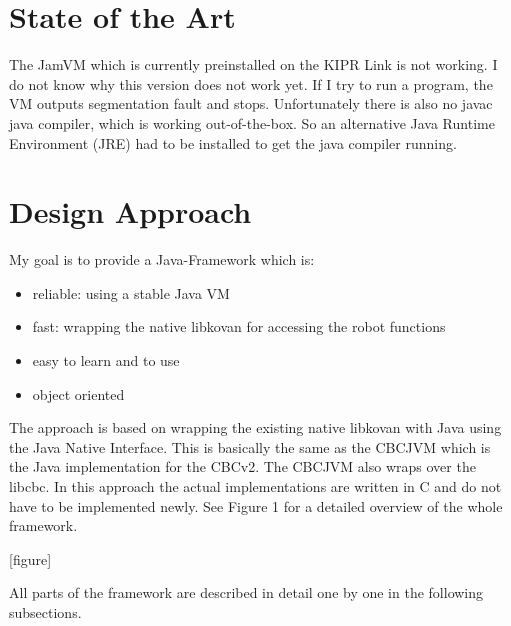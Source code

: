 \documentclass{juniorjournal}
\begin{document}
\section{State of the Art}
The JamVM which is currently preinstalled on the KIPR Link is not working.
I do not know why this version does not work yet.
If I try to run a program, the VM outputs \frqq segmentation fault \flqq and stops.
Unfortunately there is also no javac java compiler, which is working out-of-the-box.
So an alternative Java Runtime Environment (JRE) had to be installed to get the java compiler running.

\section{Design Approach}
My goal is to provide a Java-Framework which is:
\begin{itemize}
	\item reliable: using a stable Java VM
	\item fast: wrapping the native libkovan for accessing the robot functions
	\item easy to learn and to use
	\item object oriented
\end{itemize}
The approach is based on wrapping the existing native libkovan with Java using the Java Native Interface. 
This is basically the same as the CBCJVM which is the Java implementation for the CBCv2.
The CBCJVM also wraps over the libcbc.
In this approach the actual implementations are written in C and do not have to be implemented newly.
See Figure 1 for a detailed overview of the whole framework.

[figure]

All parts of the framework are described in detail one by one in the following subsections.

\begin{thebibliography}{500} %

\end{thebibliography}
\end{document}
